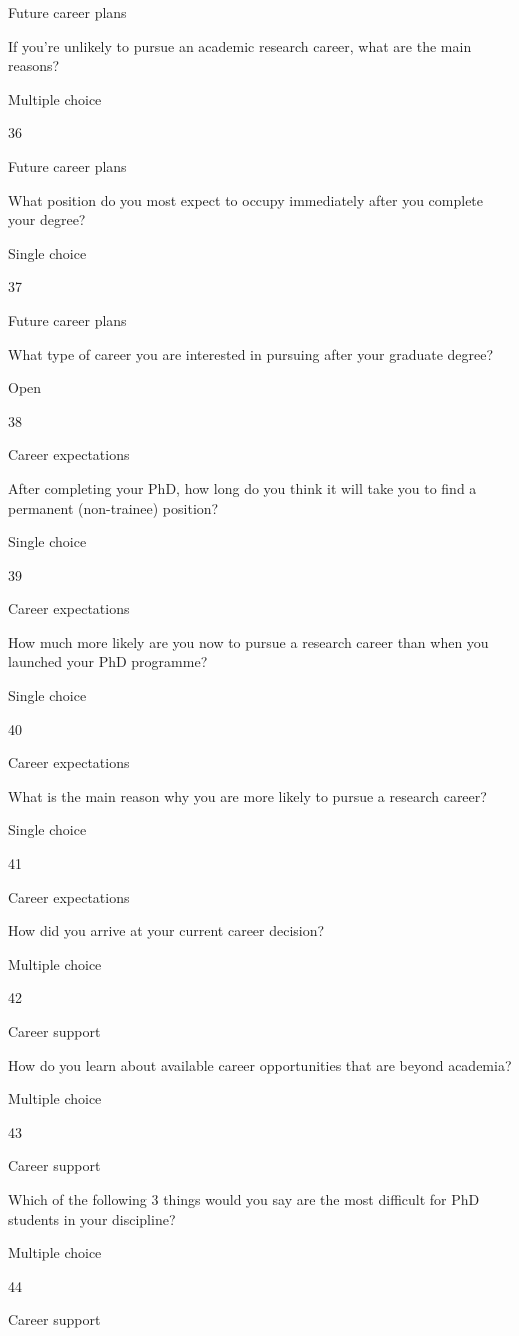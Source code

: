\documentclass[
]{article}
\begin{document}
Future career plans

If you're unlikely to pursue an academic research career, what are the
main reasons?

Multiple choice

36

Future career plans

What position do you most expect to occupy immediately after you
complete your degree?

Single choice

37

Future career plans

What type of career you are interested in pursuing after your graduate
degree?

Open

38

Career expectations

After completing your PhD, how long do you think it will take you to
find a permanent (non-trainee) position?

Single choice

39

Career expectations

How much more likely are you now to pursue a research career than when
you launched your PhD programme?

Single choice

40

Career expectations

What is the main reason why you are more likely to pursue a research
career?

Single choice

41

Career expectations

How did you arrive at your current career decision?

Multiple choice

42

Career support

How do you learn about available career opportunities that are beyond
academia?

Multiple choice

43

Career support

Which of the following 3 things would you say are the most difficult for
PhD students in your discipline?

Multiple choice

44

Career support
\end{document}
